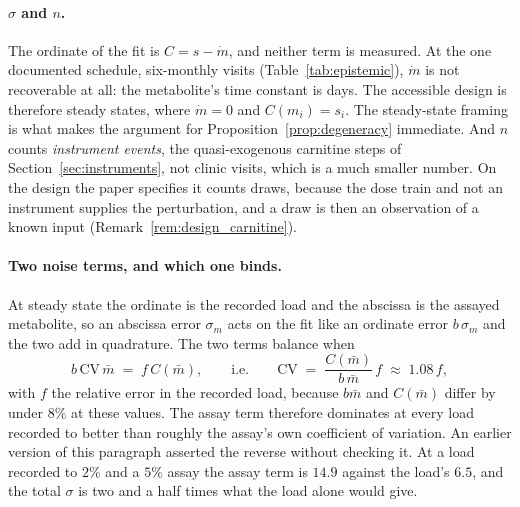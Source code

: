 \paragraph{$\sigma$ and $n$.} The ordinate of the fit is $C = s - \dot m$, and
neither term is measured. At the one documented schedule, six-monthly visits
(Table~\ref{tab:epistemic}), $\dot m$ is not recoverable at all: the metabolite's time
constant is days. The accessible design is therefore steady states, where $\dot m = 0$ and
$C(m_i) = s_i$. The steady-state framing is what makes the argument for
Proposition~\ref{prop:degeneracy} immediate. And $n$ counts \emph{instrument events}, the
quasi-exogenous carnitine steps of Section~\ref{sec:instruments}, not clinic visits, which
is a much smaller number. On the design the paper specifies it counts draws, because the
dose train and not an instrument supplies the perturbation, and a draw is then an
observation of a known input (Remark~\ref{rem:design_carnitine}).

\paragraph{Two noise terms, and which one binds.} At steady state the ordinate is the
recorded load and the abscissa is the assayed metabolite, so an abscissa error $\sigma_m$
acts on the fit like an ordinate error $b\,\sigma_m$ and the two add in quadrature. The two
terms balance when
\begin{equation}
b\,\mathrm{CV}\,\bar m \;=\; f\, C(\bar m),
\qquad\text{i.e.}\qquad
\mathrm{CV} \;=\; \frac{C(\bar m)}{b\,\bar m}\, f \;\approx\; 1.08\, f,
\label{eq:crossover}
\end{equation}
with $f$ the relative error in the recorded load, because $b\bar m$ and $C(\bar m)$ differ
by under $8\%$ at these values. The assay term therefore dominates at every load
recorded to better than roughly the assay's own coefficient of variation. An earlier
version of this paragraph asserted the reverse without checking it. At a load recorded to
$2\%$ and a $5\%$ assay the assay term is $14.9$ against the load's $6.5$, and the total
$\sigma$ is two and a half times what the load alone would give.

